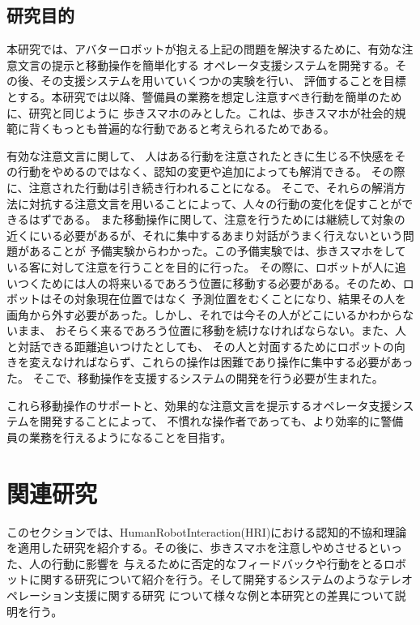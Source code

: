 \documentclass[11pt,a4j]{jreport}
\begin{document}
\section{研究目的}
本研究では、アバターロボットが抱える上記の問題を解決するために、有効な注意文言の提示と移動操作を簡単化する
オペレータ支援システムを開発する。その後、その支援システムを用いていくつかの実験を行い、
評価することを目標とする。本研究では以降、警備員の業務を想定し注意すべき行動を簡単のために、研究\cite{Schneider2022,Mizumaru2019}と同じように
歩きスマホのみとした。これは、歩きスマホが社会的規範に背くもっとも普遍的な行動であると考えられるためである。

有効な注意文言に関して、
人はある行動を注意されたときに生じる不快感をその行動をやめるのではなく、認知の変更や追加によっても解消できる。
その際に、注意された行動は引き続き行われることになる。
そこで、それらの解消方法に対抗する注意文言を用いることによって、人々の行動の変化を促すことができるはずである。
また移動操作に関して、注意を行うためには継続して対象の近くにいる必要があるが、それに集中するあまり対話がうまく行えないという問題があることが
予備実験からわかった。この予備実験では、歩きスマホをしている客に対して注意を行うことを目的に行った。
その際に、ロボットが人に追いつくためには人の将来いるであろう位置に移動する必要がある。そのため、ロボットはその対象現在位置ではなく
予測位置をむくことになり、結果その人を画角から外す必要があった。しかし、それでは今その人がどこにいるかわからないまま、
おそらく来るであろう位置に移動を続けなければならない。また、人と対話できる距離追いつけたとしても、
その人と対面するためにロボットの向きを変えなければならず、これらの操作は困難であり操作に集中する必要があった。
そこで、移動操作を支援するシステムの開発を行う必要が生まれた。


これら移動操作のサポートと、効果的な注意文言を提示するオペレータ支援システムを開発することによって、
不慣れな操作者であっても、より効率的に警備員の業務を行えるようになることを目指す。



\chapter{関連研究}
このセクションでは、HumanRobotInteraction(HRI)における認知的不協和理論を適用した研究を紹介する。その後に、歩きスマホを注意しやめさせるといった、人の行動に影響を
与えるために否定的なフィードバックや行動をとるロボットに関する研究について紹介を行う。そして開発するシステムのようなテレオペレーション支援に関する研究
について様々な例と本研究との差異について説明を行う。
\end{document}
